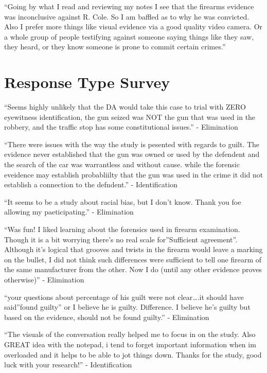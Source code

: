 \documentclass[print]{nuthesis}
\begin{document}
``Going by what I read and reviewing my notes I see that the firearms evidence was inconclusive against R. Cole. So I am baffled as to why he was convicted. Also I prefer more things like visual evidence via a good quality video camera. Or a whole group of people testifying against someone saying things like they saw, they heard, or they know someone is prone to commit certain crimes.''

\hypertarget{response-type-survey}{%
\section{Response Type Survey}\label{response-type-survey}}

``Seems highly unlikely that the DA would take this case to trial with ZERO eyewitness identification, the gun seized was NOT the gun that was used in the robbery, and the traffic stop has some constitutional issues.'' - Elimination

``There were issues with the way the study is pesented with regards to guilt. The evidence never established that the gun was owned or used by the defendent and the search of the car was warrantless and without cause. while the forensic eveidence may establish probabliilty that the gun was used in the crime it did not establish a connection to the defndent.'' - Identification

``It seems to be a study about racial bias, but I don't know. Thank you foe allowing my paeticipating.'' - Elimination

``Was fun! I liked learning about the forensics used in firearm examination. Though it is a bit worrying there's no real scale for''Sufficient agreement''. Although it's logical that grooves and twists in the firearm would leave a marking on the bullet, I did not think such differences were sufficient to tell one firearm of the same manufacturer from the other. Now I do (until any other evidence proves otherwise)'' - Elimination

``your questions about percentage of his guilt were not clear\ldots.it should have said''found guilty'' or I believe he is guilty. Difference. I believe he's guilty but based on the evidence, should not be found guilty.'' - Elimination

``The visuals of the conversation really helped me to focus in on the study. Also GREAT idea with the notepad, i tend to forget important information when im overloaded and it helps to be able to jot things down. Thanks for the study, good luck with your research!'' - Identification
\end{document}
